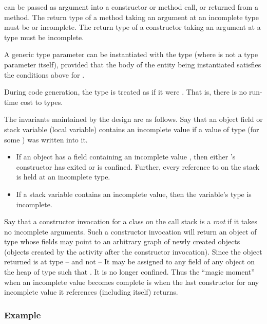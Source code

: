  can be passed as argument into a constructor or method call,
or returned from a method.  The return type of a method taking an
argument at an incomplete type must be  or incomplete.  The
return type of a constructor taking an argument at a  type
must be incomplete.
 
A generic type parameter  can be instantiated with the type  (where  is not a type parameter itself), provided that the body of
the entity being instantiated satisfies the conditions above for .

During code generation, the type  is treated as if it were
. That is, there is no run-time cost to  types.

The invariants maintained by the design are as follows.  Say that an
object field or stack variable (local variable) contains an incomplete
value if a value of type  (for some ) was written
into it.

\begin{itemize}
\item If an object  has a field containing an incomplete value ,
then either 's constructor has exited or  is confined.
Further, every reference to  on the stack is held at an incomplete type.

\item If a stack variable contains an incomplete value, then
  the variable's type is incomplete.

\end{itemize}

Say that a constructor invocation for a class  on the call
stack is a {\em root} if it takes no incomplete arguments. Such a
constructor invocation will return an object of type  whose
fields may point to an arbitrary graph of newly created objects
(objects created by the activity after the constructor
invocation). Since the object returned is at type  -- and not
 -- It may be assigned to any field of any object on the
heap of type  such that .  It is no longer
confined. Thus the ``magic moment'' when an incomplete value becomes
complete is when the last constructor for any incomplete value it
references (including itself) returns.

\subsubsection{Example}

